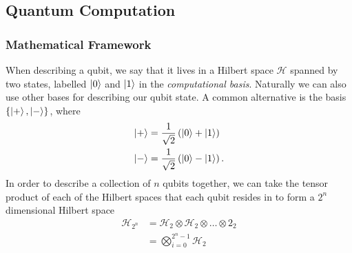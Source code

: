 \subsection{Quantum Computation}
\subsubsection{Mathematical Framework}
\label{subsubsection:mathfw}
When describing a qubit, we say that it lives in a Hilbert space $\mathcal{H}$ spanned by two states, labelled $\ket{0}$ and $\ket{1}$ in the \emph{computational basis}. Naturally we can also use other bases for describing our qubit state. A common alternative is the basis $\{\ket{+}, \ket{-}\}$, where
\begin{align}
    \ket{+} &= \frac{1}{\sqrt2} \left(\ket{0} + \ket{1}\right)\\
    \ket{-} &= \frac{1}{\sqrt2} \left(\ket{0} - \ket{1}\right).
\end{align}
In order to describe a collection of $n$ qubits together, we can take the tensor product of each of the Hilbert spaces that each qubit resides in to form a $2^n$ dimensional Hilbert space
\begin{align}
    \mathcal{H}_{2^n} &= \mathcal{H}_{2} \otimes \mathcal{H}_2 \otimes \dots \otimes \mathcal{2}_2\\
    & = \bigotimes_{i = 0}^{2^n - 1}\mathcal{H}_2
\end{align}
